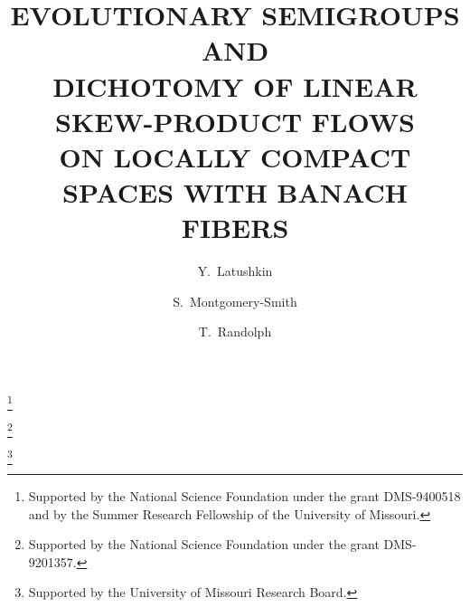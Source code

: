 \newcommand{\TH}{\Theta}
\newcommand{\th}{\theta}
\newcommand{\lam}{\lambda}
\newcommand{\sig}{\sigma}
\newcommand{\eps}{\epsilon}
\newcommand{\gam}{\gamma}
\newcommand{\Gam}{\Gamma}
\newcommand{\vphi}{\varphi}
\newcommand{\Lam}{\Lambda}
\newcommand{\bd}{\text{{\bf d}}}

\newcommand{\scr}{\scriptstyle}
\newcommand{\disp}{\displaystyle}
\newcommand{\lb}{\label}
\newcommand{\ti}{\tilde}
\newcommand{\no}{\nonumber}
\newcommand{\bi}[1]{\bibitem[#1]{#1}}
\newcommand{\bs}{\backslash}
\newcommand{\hp}{{\hat{\vphi}}}

\newcommand{\co}{C_0(\Theta,X)}
\newcommand{\coR}{C_0(\bbR,X)}
\newcommand{\Bco}{B(C_0(\Theta,X))}
\newcommand{\linf}{\ell_\infty(\bbZ,X)}
\newcommand{\Blinf}{B(\ell_\infty(\bbZ,X))}

\newcommand{\sumk}{\sum_{k=-\infty}^\infty}
\newcommand{\sumj}{\sum_{j=-\infty}^\infty}


\setcounter{section}{0}

\renewcommand{\theequation}{\thesection.\arabic{equation}}
\renewcommand{\thesection}{\arabic{section}}
\renewcommand{\theprop}{\arabic{section}.\arabic{prop}}




\baselineskip=16pt

\title[EVOLUTIONARY SEMIGROUPS AND\\
DICHOTOMY OF LSPF]{EVOLUTIONARY SEMIGROUPS AND\\ DICHOTOMY OF
LINEAR SKEW-PRODUCT FLOWS\\ ON LOCALLY COMPACT SPACES WITH BANACH
FIBERS}
\makeatletter
\author{Y.~Latushkin}
\address{ Department of  Mathematics\\
University of Missouri\\ Columbia, MO
65211}
\thanks{
Supported by
the National Science
 Foundation under the grant  DMS-9400518 and by the Summer Research
Fellowship of the University of Missouri.}
\author{S.~Montgomery-Smith}
\address{ Department of  Mathematics\\
University of Missouri\\ Columbia, MO 65211}
\thanks{Supported by
the National Science
 Foundation under the grant  DMS-9201357.}
\author{T.~Randolph}
\address{ Department of  Mathematics\\
University of Missouri\\ Rolla, MO 65401}
\makeatother
\thanks{Supported by the University of Missouri Research Board.}

